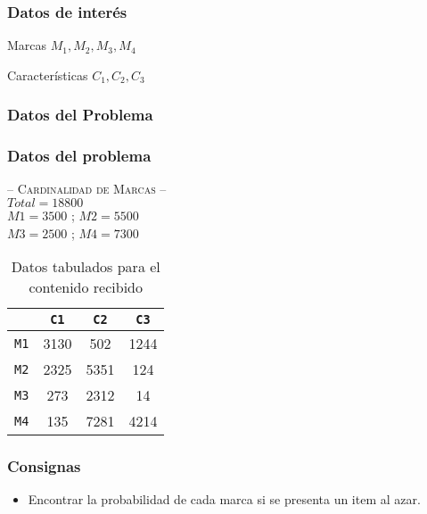 \documentclass{beamer}
\begin{document}
\begin{frame}
\frametitle{Datos de inter\'es}
\begin{block}{Marcas}
$M_{1}, M_{2}, M_{3}, M_{4}$
\end{block}

\begin{block}{Características}
$C_{1}, C_{2}, C_{3}$
\end{block}
\end{frame}


\begin{frame}
\frametitle{Datos del Problema}
\end{frame}


\begin{frame}
\frametitle{Datos del problema}
\begin{center}
\textsc{-- Cardinalidad de Marcas --}\\
$Total=18800$ \\
$M1=3500$	;	$M2=5500$\\
$M3=2500$	;	$M4=7300$
\end{center}
\begin{table}[ht]
\caption{Datos tabulados para el contenido recibido}
\centering
\begin{tabular}{c | c c c }
\hline
		& \texttt{C1} & \texttt{C2} & \texttt{C3} \\ \hline
\texttt{M1} 	&     3130   &      502    &     1244     \\
\texttt{M2} 	&     2325   &      5351    &     124     \\
\texttt{M3} 	&     273   &      2312    &     14     \\
\texttt{M4} 	&     135   &      7281    &     4214  \\ \hline
\end{tabular}
\label{tab:datoscontenido}
\end{table}
\end{frame}


\begin{frame}
\frametitle{Consignas}
\begin{itemize}
\item Encontrar la probabilidad de cada marca si se presenta un item al azar.
\end{itemize}
\end{frame}
\end{document}
